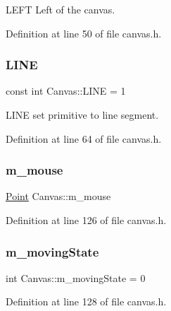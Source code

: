 L\+E\+FT Left of the canvas. 



Definition at line 50 of file canvas.\+h.

\mbox{\label{class_canvas_a28b792bd16aaf737eab6d697a211183a}} 
\subsubsection{\texorpdfstring{L\+I\+NE}{LINE}}
{\footnotesize\ttfamily const int Canvas\+::\+L\+I\+NE = 1\hspace{0.3cm}{\ttfamily [static]}}



L\+I\+NE set primitive to line segment. 



Definition at line 64 of file canvas.\+h.

\mbox{\label{class_canvas_a37d2fd203dc21501aee37001e49789b1}} 
\subsubsection{\texorpdfstring{m\+\_\+mouse}{m\_mouse}}
{\footnotesize\ttfamily \hyperlink{class_point}{Point} Canvas\+::m\+\_\+mouse\hspace{0.3cm}{\ttfamily [private]}}



Definition at line 126 of file canvas.\+h.

\mbox{\label{class_canvas_a0d0f98258b42bd7b40f175baf3f1220a}} 
\subsubsection{\texorpdfstring{m\+\_\+moving\+State}{m\_movingState}}
{\footnotesize\ttfamily int Canvas\+::m\+\_\+moving\+State = 0\hspace{0.3cm}{\ttfamily [private]}}



Definition at line 128 of file canvas.\+h.

\mbox{\label{class_canvas_adb29cf13087e13c9d4a1ef04bc53b931}} 
